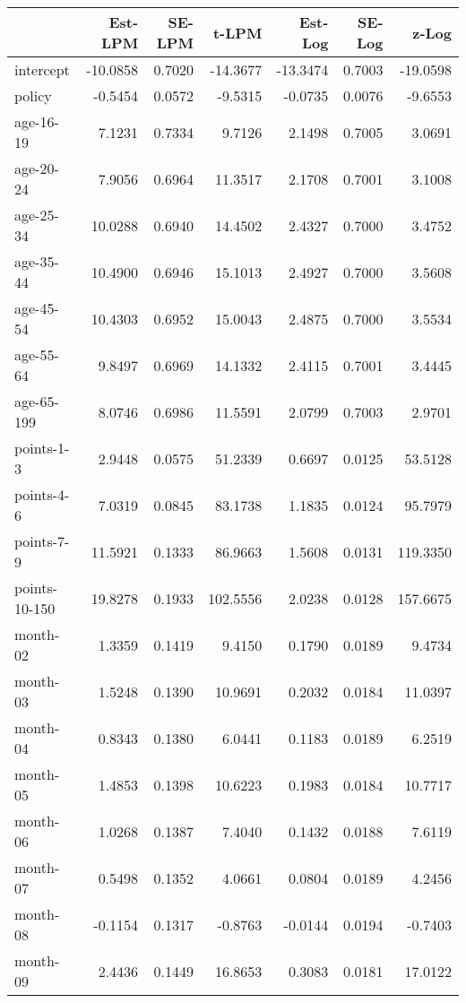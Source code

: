\documentclass[10pt]{article}
\begin{document}
\begin{table}[ht]
\centering
\begin{tabular}{lrrrrrr}
  \hline
 & Est-LPM & SE-LPM & t-LPM & Est-Log & SE-Log & z-Log \\ 
  \hline
intercept & -10.0858 & 0.7020 & -14.3677 & -13.3474 & 0.7003 & -19.0598 \\ 
  policy & -0.5454 & 0.0572 & -9.5315 & -0.0735 & 0.0076 & -9.6553 \\ 
  age-16-19 & 7.1231 & 0.7334 & 9.7126 & 2.1498 & 0.7005 & 3.0691 \\ 
  age-20-24 & 7.9056 & 0.6964 & 11.3517 & 2.1708 & 0.7001 & 3.1008 \\ 
  age-25-34 & 10.0288 & 0.6940 & 14.4502 & 2.4327 & 0.7000 & 3.4752 \\ 
  age-35-44 & 10.4900 & 0.6946 & 15.1013 & 2.4927 & 0.7000 & 3.5608 \\ 
  age-45-54 & 10.4303 & 0.6952 & 15.0043 & 2.4875 & 0.7000 & 3.5534 \\ 
  age-55-64 & 9.8497 & 0.6969 & 14.1332 & 2.4115 & 0.7001 & 3.4445 \\ 
  age-65-199 & 8.0746 & 0.6986 & 11.5591 & 2.0799 & 0.7003 & 2.9701 \\ 
  points-1-3 & 2.9448 & 0.0575 & 51.2339 & 0.6697 & 0.0125 & 53.5128 \\ 
  points-4-6 & 7.0319 & 0.0845 & 83.1738 & 1.1835 & 0.0124 & 95.7979 \\ 
  points-7-9 & 11.5921 & 0.1333 & 86.9663 & 1.5608 & 0.0131 & 119.3350 \\ 
  points-10-150 & 19.8278 & 0.1933 & 102.5556 & 2.0238 & 0.0128 & 157.6675 \\ 
  month-02 & 1.3359 & 0.1419 & 9.4150 & 0.1790 & 0.0189 & 9.4734 \\ 
  month-03 & 1.5248 & 0.1390 & 10.9691 & 0.2032 & 0.0184 & 11.0397 \\ 
  month-04 & 0.8343 & 0.1380 & 6.0441 & 0.1183 & 0.0189 & 6.2519 \\ 
  month-05 & 1.4853 & 0.1398 & 10.6223 & 0.1983 & 0.0184 & 10.7717 \\ 
  month-06 & 1.0268 & 0.1387 & 7.4040 & 0.1432 & 0.0188 & 7.6119 \\ 
  month-07 & 0.5498 & 0.1352 & 4.0661 & 0.0804 & 0.0189 & 4.2456 \\ 
  month-08 & -0.1154 & 0.1317 & -0.8763 & -0.0144 & 0.0194 & -0.7403 \\ 
  month-09 & 2.4436 & 0.1449 & 16.8653 & 0.3083 & 0.0181 & 17.0122 \\ 

\end{tabular}
\end{table}
\end{document}
